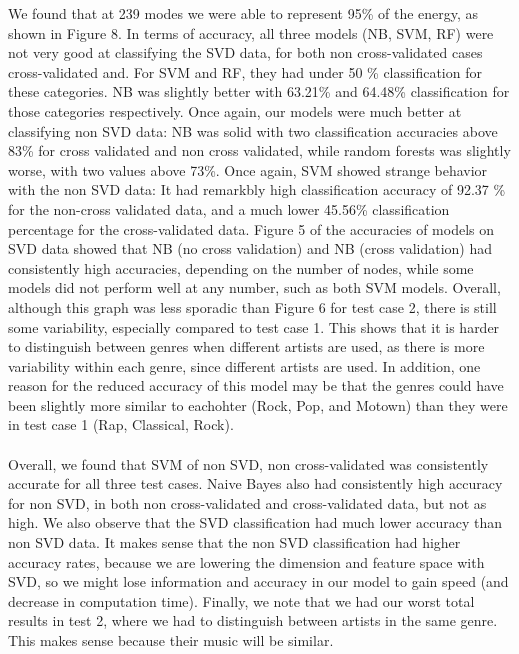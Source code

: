 \documentclass{article}
\begin{document}
We found that at 239 modes we were able to represent 95\% of the energy, as shown in Figure 8. In terms of accuracy, all three models (NB, SVM, RF) were not very good at classifying the SVD data, for both non cross-validated cases cross-validated and. For SVM and RF, they had under 50 \% classification for these categories. NB was slightly better with 63.21\% and 64.48\% classification for those categories respectively. Once again, our models were much better at classifying non SVD data: NB was solid with two classification accuracies above 83\% for cross validated and non cross validated, while random forests was slightly worse, with two values above 73\%. Once again, SVM showed strange behavior with the non SVD data: It had remarkbly high classification accuracy of 92.37 \% for the non-cross validated data, and a much lower 45.56\% classification percentage for the cross-validated data. Figure 5 of the accuracies of models on SVD data showed that NB (no cross validation) and NB (cross validation) had consistently high accuracies, depending on the number of nodes, while some models did not perform well at any number, such as both SVM models. Overall, although this graph was less sporadic than Figure 6 for test case 2, there is still some variability, especially compared to test case 1. This shows that it is harder to distinguish between genres when different artists are used, as there is more variability within each genre, since different artists are used. In addition, one reason for the reduced accuracy of this model may be that the genres could have been slightly more similar to eachohter (Rock, Pop, and Motown) than they were in test case 1 (Rap, Classical, Rock). \\ \\
Overall, we found that SVM of non SVD, non cross-validated was consistently accurate for all three test cases. Naive Bayes also had consistently high accuracy for non SVD, in both non cross-validated and cross-validated data, but not as high. We also observe that the SVD classification had much lower accuracy than non SVD data. It makes sense that the non SVD classification had higher accuracy rates, because we are lowering the dimension and feature space with SVD, so we might lose information and accuracy in our model to gain speed (and decrease in computation time). Finally, we note that we had our worst total results in test 2, where we had to distinguish between artists in the same genre. This makes sense because their music will be similar.
\end{document}
